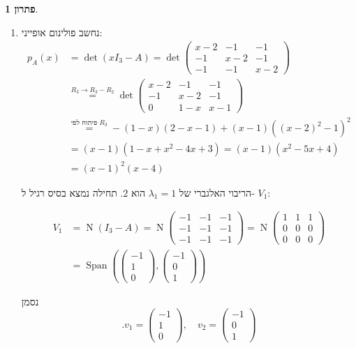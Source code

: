 \documentclass[12pt]{report}
\theoremstyle{plain}
\theoremstyle{definition}
\newtheorem*{solution}{פתרון}
\newcommand{\0}{\mathbf{0}}
\DeclareMathOperator{\Span}{Span}
\DeclareMathOperator{\Null}{N}
\begin{document}
\begin{solution}
\begin{enumerate}[label=\alph*.]\
\item
נחשב פולינום אופייני:
$$
\begin{aligned}
p_A(x)&=\det(xI_3-A)=\det\begin{pmatrix}
x-2 & -1 & -1 \\
-1 & x-2 & -1 \\
-1 & -1 & x-2
\end{pmatrix} \\
&\overset{R_3\to R_3-R_2}=\det\begin{pmatrix}
x-2 & -1 & -1 \\
-1 & x-2 & -1 \\
0 & 1-x & x-1
\end{pmatrix} \\
&\overset{\text{פיתוח לפי $R_3$}}=-(1-x)(2-x-1)+(x-1)\left((x-2)^2-1\right)^2 \\
&=(x-1)(1-x+x^2-4x+3)=(x-1)(x^2-5x+4)\\
&=(x-1)^2(x-4)
\end{aligned}
$$

הריבוי האלגברי של
$\lambda_1=1$
הוא 
$2$.
תחילה נמצא בסיס רגיל ל-
$V_1$:

$$
\begin{aligned}
V_1&=\Null(I_3-A)=\Null\begin{pmatrix}
-1 & -1 & -1 \\
-1 & -1 & -1 \\
-1 & -1 & -1
\end{pmatrix}=\Null\begin{pmatrix}
1 & 1 & 1 \\
0 & 0 & 0 \\
0 & 0 & 0
\end{pmatrix} \\
&=\Span\left(\begin{pmatrix}-1\\1\\0\end{pmatrix},\begin{pmatrix}-1\\0\\1\end{pmatrix}\right)
\end{aligned}
$$

נסמן 
$$
.v_1=\begin{pmatrix}-1\\1\\0\end{pmatrix},\quad v_2=\begin{pmatrix}-1\\0\\1\end{pmatrix}
$$


\end{enumerate}
\end{solution}
\end{document}
